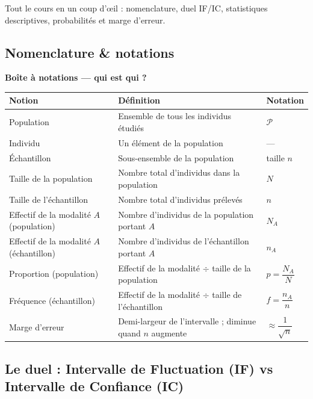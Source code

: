 \documentclass[11pt,a4paper]{article}
\begin{document}
	Tout le cours en un coup d'œil : nomenclature, duel IF/IC, statistiques
	descriptives, probabilités et marge d'erreur.
	
	\subsection{Nomenclature \& notations}
	
	\begin{center}
		\sffamily\bfseries Boîte à notations — qui est qui ?\\[6pt]
		\begin{tabularx}{\textwidth}{>{\raggedright\arraybackslash}p{4.6cm} X >{\raggedright\arraybackslash}p{3.2cm}}
			\toprule
			\textbf{Notion} & \textbf{Définition} & \textbf{Notation} \\
			\midrule
			Population & Ensemble de tous les individus étudiés & $\mathcal{P}$ \\
			Individu & Un élément de la population & — \\
			Échantillon & Sous-ensemble de la population & taille $n$ \\
			Taille de la population & Nombre total d'individus dans la population & $N$ \\
			Taille de l'échantillon & Nombre total d'individus prélevés & $n$ \\
			Effectif de la modalité $A$ (population) &
			Nombre d'individus de la population portant $A$ & $N_A$ \\
			Effectif de la modalité $A$ (échantillon) &
			Nombre d'individus de l'échantillon portant $A$ & $n_A$ \\
			Proportion (population) &
			Effectif de la modalité $\div$ taille de la population &
			$p = \dfrac{N_A}{N}$ \\
			Fréquence (échantillon) &
			Effectif de la modalité $\div$ taille de l'échantillon &
			$f = \dfrac{n_A}{n}$ \\
			Marge d'erreur &
			Demi-largeur de l'intervalle ; diminue quand $n$ augmente &
			$\approx \dfrac{1}{\sqrt{n}}$ \\
			\bottomrule
		\end{tabularx}
	\end{center}
	
	\subsection{Le duel : Intervalle de Fluctuation (IF) vs Intervalle de Confiance (IC)}
	
\end{document}
